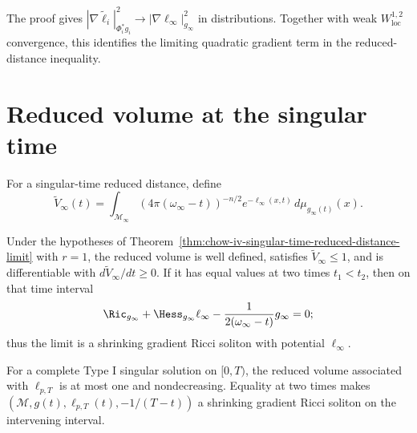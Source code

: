 \begin{remark}
\label{rem:chow-iv-strong-reduced-distance-gradient-convergence}
The proof gives
\(|\nabla\widetilde\ell_i|^2_{\Phi_i^*g_i}
\to|\nabla\ell_\infty|^2_{g_\infty}\) in distributions.  Together with
weak \(W^{1,2}_{\mathrm{loc}}\) convergence, this identifies the limiting
quadratic gradient term in the reduced-distance inequality.
\end{remark}

\section{Reduced volume at the singular time}

For a singular-time reduced distance, define
\[
 \widetilde V_\infty(t)=
 \int_{\mathcal M_\infty}(4\pi(\omega_\infty-t))^{-n/2}
 e^{-\ell_\infty(x,t)}\,d\mu_{g_\infty(t)}(x).
\]

\begin{theorem}
\label{thm:chow-iv-singular-time-reduced-volume-monotonicity}
Under the hypotheses of
Theorem~\ref{thm:chow-iv-singular-time-reduced-distance-limit} with \(r=1\),
the reduced volume is well defined, satisfies \(\widetilde V_\infty\leq1\),
and is differentiable with \(d\widetilde V_\infty/dt\geq0\).  If it has
equal values at two times \(t_1<t_2\), then on that time interval
\[
 \Ric_{g_\infty}+\Hess_{g_\infty}\ell_\infty
 -\frac{1}{2(\omega_\infty-t)}g_\infty=0;
\]
thus the limit is a shrinking gradient Ricci soliton with potential
\(\ell_\infty\).
\end{theorem}

\begin{corollary}
\label{cor:chow-iv-type-i-singular-time-reduced-volume}
For a complete Type I singular solution on \([0,T)\), the reduced volume
associated with \(\ell_{p,T}\) is at most one and nondecreasing.  Equality at
two times makes
\((\mathcal M,g(t),\ell_{p,T}(t),-1/(T-t))\) a shrinking gradient Ricci
soliton on the intervening interval.
\end{corollary}


